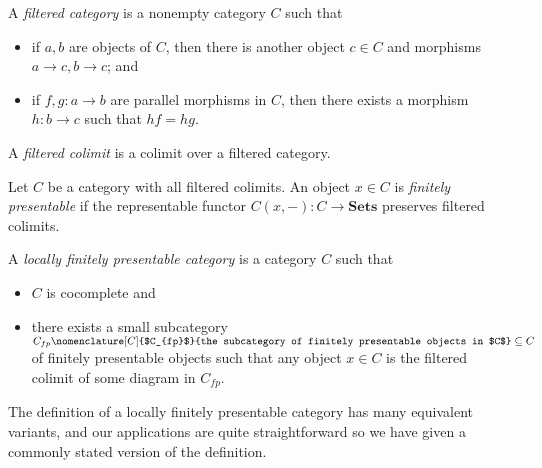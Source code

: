 \documentclass{amsbook} %
\newcommand{\cn}{\colon}
\newcommand{\mb}{\mathbf}
\numberwithin{section}{chapter}
\begin{document}
\begin{Defi}\label{def:filtered}
A \textit{filtered category} is a nonempty category $C$ such that
\begin{itemize}
\item if $a,b$ are objects of $C$, then there is another object $c \in C$ and morphisms $a \to c, b \to c$; and
\item if $f,g \cn a \to b$ are parallel morphisms in $C$, then there exists a morphism $h \cn b \to c$ such that $hf = hg$.
\end{itemize}
\end{Defi}

\begin{Defi}
A \emph{filtered colimit} is a colimit over a filtered category.
\end{Defi}

\begin{Defi}
Let $C$ be a category with all filtered colimits.  An object $x \in C$ is \textit{finitely presentable} if the representable functor $C(x, -):C \rightarrow \mb{Sets}$ preserves filtered colimits.
\end{Defi}

\begin{Defi}
A \textit{locally finitely presentable category} is a category $C$ such that
\begin{itemize}
\item $C$ is cocomplete and
\item there exists a small subcategory $C_{fp}\nomenclature[C]{$C_{fp}$}{the subcategory of finitely presentable objects in $C$} \subseteq C$ of finitely presentable objects such that any object $x \in C$ is the filtered colimit of some diagram in $C_{fp}$.
\end{itemize}
\end{Defi}

The definition of a locally finitely presentable category has many equivalent variants, and our applications are quite straightforward so we have given a commonly stated version of the definition.
\end{document}
